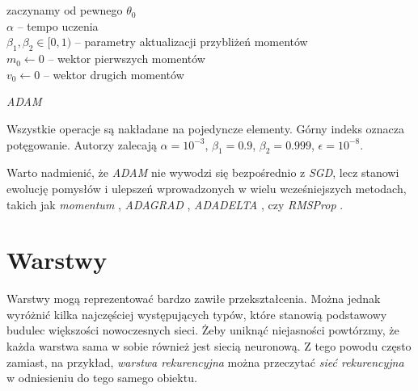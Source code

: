\begin{algorithm}[h]
    \\\\zaczynamy od pewnego $\theta_0$\\
    $\alpha$ -- tempo uczenia\\
    $\beta_1, \beta_2 \in [0,1)$ -- parametry aktualizacji przybliżeń momentów\\[5pt]
    $m_0 \gets 0$ -- wektor pierwszych momentów\\
    $v_0 \gets 0$ -- wektor drugich momentów\\
    \caption{\textit{ADAM}}
\end{algorithm}
\vspace{-10pt}\small\noindent
Wszystkie operacje są nakładane na pojedyncze elementy. Górny indeks oznacza potęgowanie. Autorzy zalecają $\alpha = 10^{-3}$, $\beta_1 = 0.9$, $\beta_2 = 0.999$, $\epsilon = 10^{-8}$.\\[-10pt]
\normalsize

Warto nadmienić, że \textit{ADAM} nie wywodzi się bezpośrednio z \textit{SGD}, lecz stanowi ewolucję pomysłów i ulepszeń wprowadzonych w wielu wcześniejszych metodach, takich jak \textit{momentum} \cite{momentum}, \textit{ADAGRAD} \cite{adagrad}, \textit{ADADELTA} \cite{adadelta}, czy \textit{RMSProp} \cite{rmsprop}.


\section{Warstwy}
Warstwy mogą reprezentować bardzo zawiłe przekształcenia. Można jednak wyróżnić kilka najczęściej występujących typów, które stanowią podstawowy budulec większości nowoczesnych sieci. Żeby uniknąć niejasności powtórzmy, że każda warstwa sama w sobie również jest siecią neuronową. Z tego powodu często zamiast, na przykład, \textit{warstwa rekurencyjna} można przeczytać \textit{sieć rekurencyjna} w odniesieniu do tego samego obiektu.

